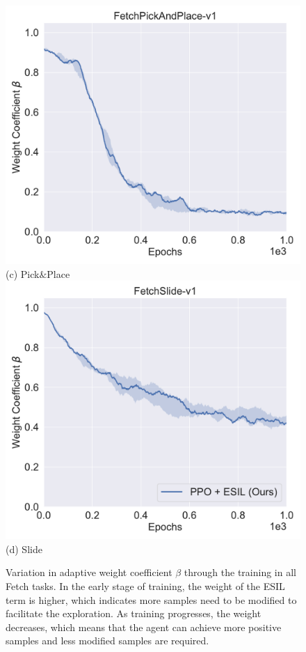 \begin{figure}[h!]
  \includegraphics[width=\linewidth]{figures/chapter3/pick_samples.pdf}
  ({c}) Pick$\&$Place
\endminipage
{}%
  \centering
  \includegraphics[width=\linewidth]{figures/chapter3/slide_samples.pdf}
  ({d}) Slide
\endminipage\hfill
\caption[Variation in adaptive weight coefficient $\beta$ during training.]{Variation in adaptive weight coefficient $\beta$ through the training in all Fetch tasks. In the early stage of training, the weight of the ESIL term is higher, which indicates more samples need to be modified to facilitate the exploration. As training progresses, the weight decreases, which means that the agent can achieve more positive samples and less modified samples are required.}
\label{fig:her_samples_compare}
\end{figure}

